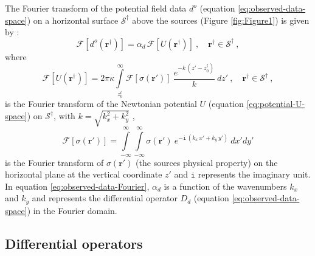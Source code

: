 The Fourier transform of the potential field data $d^{o}$ (equation \ref{eq:observed-data-space}) 
on a horizontal surface $\mathcal{S}^{\dagger}$ above the sources (Figure \ref{fig:Figure1}) is given 
by \citep[e.g.,][]{bhattacharyya1967,gunn1975}:
\begin{equation}
	\mathcal{F} [ d^{o}(\mathbf{r}^{\dagger}) ] =
	\alpha_{d} \, \mathcal{F} [ U(\mathbf{r}^{\dagger}) ] \: ,
	\quad \mathbf{r}^{\dagger} \in \mathcal{S}^{\dagger} \: ,
	\label{eq:observed-data-Fourier}
\end{equation}
where 
\begin{equation}
	\mathcal{F} [ U(\mathbf{r}^{\dagger}) ] = 2 \pi \kappa 
	\int\limits_{z^{t}_{0}}^{\infty}
	\mathcal{F} [ \sigma(\mathbf{r}') ] \:
	\frac{e^{- k \, (z' - z^{\dagger}_{0})}}{k}
	\: dz' \: , 
	\quad \mathbf{r}^{\dagger} \in \mathcal{S}^{\dagger} \: ,
	\label{eq:potential-U-Fourier}
\end{equation}
is the Fourier transform of the Newtonian potential 
$U$ (equation \ref{eq:potential-U-space}) on $\mathcal{S}^{\dagger}$, with $k = \sqrt{k_{x}^{2} + k_{y}^{2}}$ ,
\begin{equation}
	\mathcal{F} [ \sigma(\mathbf{r}') ] = 
	\int\limits_{-\infty}^{\infty}\int\limits_{-\infty}^{\infty}
	\sigma(\mathbf{r}') \: e^{-\mathtt{i} \, (k_{x} \, x' + k_{y} \, y')}
	\: dx'dy'
	\label{eq:sigma-Fourier}
\end{equation}
is the Fourier transform of $\sigma(\mathbf{r}')$ 
(the sources physical property) on the horizontal plane at the vertical
coordinate $z'$ and $\mathtt{i}$ represents the imaginary unit.
In equation \ref{eq:observed-data-Fourier}, $\alpha_{d}$ is a function of the 
wavenumbers $k_{x}$ and $k_{y}$ and represents the differential operator 
$D_{d}$ (equation \ref{eq:observed-data-space}) in the Fourier domain.

\subsection{Differential operators}
\label{sec:diff_operators}

